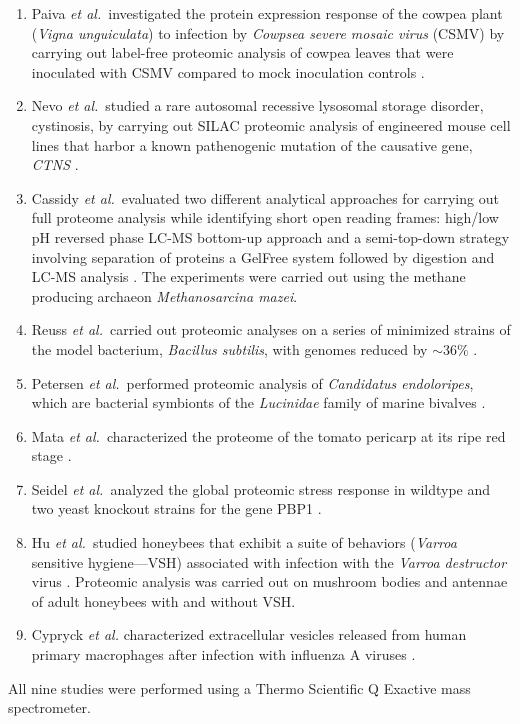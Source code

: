 \documentclass{article}
\begin{document}
\begin{enumerate}
\item Paiva \textit{et al.}\ investigated the protein expression response of the cowpea plant (\textit{Vigna unguiculata}) to infection by \textit{Cowpsea severe mosaic virus} (CSMV) by carrying out label-free proteomic analysis of cowpea leaves that were inoculated with CSMV compared to mock inoculation controls \cite{paiva2016label}.
\item Nevo \textit{et al.}\ studied a rare autosomal recessive lysosomal storage disorder, cystinosis, by carrying out SILAC proteomic analysis of engineered mouse cell lines that harbor a known pathenogenic mutation of the causative gene, \textit{CTNS} \cite{nevo2017impact}.
\item Cassidy \textit{et al.}\ evaluated two different analytical approaches for carrying out full proteome analysis while identifying short open reading frames: high/low pH reversed phase LC-MS bottom-up approach and a semi-top-down strategy involving separation of proteins a GelFree system followed by digestion and LC-MS analysis \cite{cassidy2016combination}. The experiments were carried out using the methane producing archaeon \textit{Methanosarcina mazei}.
\item Reuss \textit{et al.}\ carried out proteomic analyses on a series of minimized strains of the model bacterium, \textit{Bacillus subtilis}, with genomes reduced by $\sim$36\% \cite{reuss2017large}.
\item Petersen \textit{et al.}\ performed proteomic analysis of \textit{Candidatus endoloripes}, which are bacterial symbionts of the \textit{Lucinidae} family of marine bivalves \cite{petersen2016chemosynthetic}.
\item Mata \textit{et al.}\ characterized the proteome of the tomato pericarp at its ripe red stage \cite{mata2017depth}.
\item Seidel \textit{et al.}\ analyzed the global proteomic stress response in wildtype and two yeast knockout strains for the gene PBP1  \cite{seidel2017quantitative}.
\item Hu \textit{et al.}\ studied honeybees that exhibit a suite of behaviors (\textit{Varroa} sensitive hygiene---VSH) associated with infection with the \textit{Varroa destructor} virus \cite{hu2016proteome}.  Proteomic analysis was carried out on mushroom bodies and antennae of adult honeybees with and without VSH.
\item Cypryck \textit{et al.} characterized extracellular vesicles released from human primary macrophages after infection with influenza A viruses \cite{cypryk2017proteomic}.
\end{enumerate}
All nine studies were performed using a Thermo Scientific Q Exactive mass spectrometer.
\end{document}
